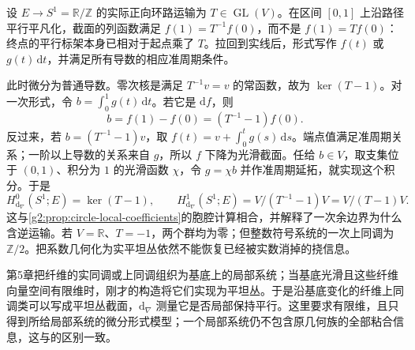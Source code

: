 \begin{example}\label{g2:exm:flat-circle-de-rham}
	设 \(E\to S^1=\mathbb R/\mathbb Z\) 的实际正向环路运输为 \(T\in\operatorname{GL}(V)\)。在区间 \([0,1]\) 上沿路径平行平凡化，截面的列函数满足 \(f(1)=T^{-1}f(0)\)，而不是 \(f(1)=Tf(0)\)：终点的平行标架本身已相对于起点乘了 \(T\)。拉回到实线后，形式写作 \(f(t)\) 或 \(g(t)\,\mathrm dt\)，并满足所有导数的相应准周期条件。

	此时微分为普通导数。零次核是满足 \(T^{-1}v=v\) 的常函数，故为 \(\ker(T-1)\)。对一次形式，令 \(b=\int_0^1g(t)\,\mathrm dt\)。若它是 \(\mathrm df\)，则
	\[
		b=f(1)-f(0)=(T^{-1}-1)f(0).
	\]
	反过来，若 \(b=(T^{-1}-1)v\)，取 \(f(t)=v+\int_0^t g(s)\,\mathrm ds\)。端点值满足准周期关系；一阶以上导数的关系来自 \(g\)，所以 \(f\) 下降为光滑截面。任给 \(b\in V\)，取支集位于 \((0,1)\)、积分为 \(1\) 的光滑函数 \(\chi\)，令 \(g=\chi b\) 并作准周期延拓，就实现这个积分。于是
	\[
		H^0_{\mathrm d_\nabla}(S^1;E)=\ker(T-1),\qquad
		H^1_{\mathrm d_\nabla}(S^1;E)=V/(T^{-1}-1)V=V/(T-1)V.
	\]
	这与\cref{g2:prop:circle-local-coefficients}的胞腔计算相合，并解释了一次余边界为什么含逆运输。若 \(V=\mathbb R\)、\(T=-1\)，两个群均为零；但整数符号系统的一次上同调为 \(\mathbb Z/2\)。把系数几何化为实平坦丛依然不能恢复已经被实数消掉的挠信息。
\end{example}

第5章把纤维的实同调或上同调组织为基底上的局部系统；当基底光滑且这些纤维向量空间有限维时，刚才的构造将它们实现为平坦丛。于是沿基底变化的纤维上同调类可以写成平坦丛截面，\(\mathrm d_\nabla\) 测量它是否局部保持平行。这里要求有限维，且只得到所给局部系统的微分形式模型；一个局部系统仍不包含原几何族的全部粘合信息，这与的区别一致。
